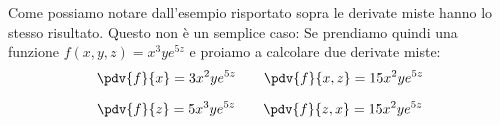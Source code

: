 Come possiamo notare dall'esempio risportato sopra le derivate miste hanno lo 
stesso risultato. Questo non è un semplice caso:
Se prendiamo quindi una funzione $f(x, y, z) = x^3 y e^{5z}$ e proiamo a 
calcolare due derivate miste:
\begin{equation*}
	\pdv{f}{x} = 3x^2 y e^{5z} \qquad \pdv{f}{x, z} = 15x^2 y e^{5z} 
\end{equation*}

\begin{equation*}
	\pdv{f}{z} = 5x^3 y e^{5z} \qquad \pdv{f}{z, x} = 15x^2 y e^{5z} 
\end{equation*}


